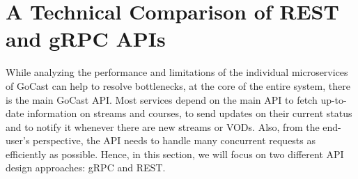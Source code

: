 


\section{A Technical Comparison of REST and gRPC APIs}

While analyzing the performance and limitations of the individual microservices of GoCast can help to resolve bottlenecks, at the core of the entire system, there is the main GoCast \ac{API}.
Most services depend on the main \ac{API} to fetch up-to-date information on streams and courses, to send updates on their current status and to notify it whenever there are new streams or \ac{VOD}s. Also, from the end-user's perspective, the \ac{API} needs to handle many concurrent requests as efficiently as possible. Hence, in this section, we will focus on two different \ac{API} design approaches: \ac{gRPC} and \ac{REST}.

